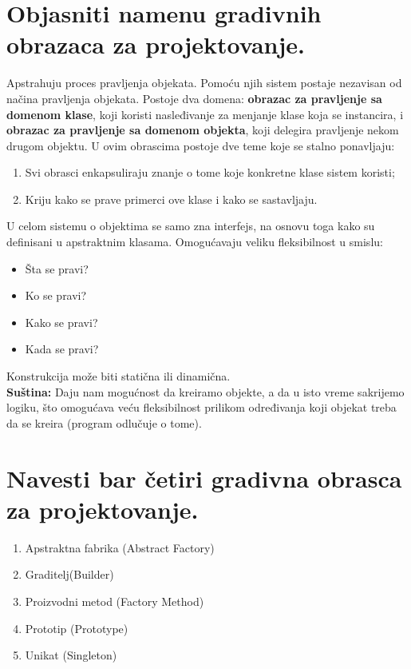 \documentclass[a4paper]{article}
\begin{document}
\section{Objasniti namenu gradivnih obrazaca za projektovanje.}
  Apstrahuju proces pravljenja objekata. Pomoću njih sistem postaje nezavisan od načina pravljenja 
  objekata. Postoje dva domena: \textbf{obrazac za pravljenje sa domenom klase}, koji koristi nasleđivanje 
  za menjanje klase koja se instancira, i \textbf{obrazac za pravljenje sa domenom objekta}, 
  koji delegira pravljenje nekom drugom objektu. U ovim obrascima postoje dve teme koje se stalno 
  ponavljaju:
  \begin{enumerate}
    \item Svi obrasci enkapsuliraju znanje o tome koje konkretne klase sistem koristi;
    \item Kriju kako se prave primerci ove klase i kako se sastavljaju.
  \end{enumerate}
  U celom sistemu o objektima se samo zna interfejs, na osnovu toga kako su definisani u apstraktnim
  klasama. Omogućavaju veliku fleksibilnost u smislu:
  \begin{itemize}
    \item Šta se pravi?
    \item Ko se pravi?
    \item Kako se pravi?
    \item Kada se pravi?
  \end{itemize}
  Konstrukcija može biti statična ili dinamična.\\

  \textbf{Suština:} Daju nam mogućnost da kreiramo objekte, a da u isto vreme sakrijemo logiku, što 
  omogućava veću fleksibilnost prilikom određivanja koji objekat treba da se kreira
  (program odlučuje o tome).

\section{Navesti bar četiri gradivna obrasca za projektovanje.}
  \begin{enumerate}
    \item Apstraktna fabrika (Abstract Factory)
    \item Graditelj(Builder)
    \item Proizvodni metod (Factory Method)
    \item Prototip (Prototype)
    \item Unikat (Singleton)
  \end{enumerate}
\end{document}
